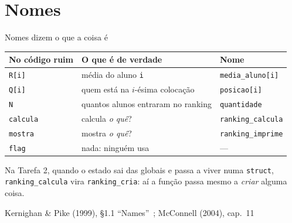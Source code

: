 \documentclass[aspectratio=169]{beamer}
\newcommand{\fonte}[1]{\vfill\hfill{\scriptsize\textcolor{UFSGray}{#1}}}
\begin{document}
\section{Nomes}

\begin{frame}{Nomes dizem o que a coisa é}
  \begin{center}
  \small
  \begin{tabular}{l l l}
    \toprule
    \textbf{No código ruim} & \textbf{O que é de verdade} &
      \textbf{Nome} \\
    \midrule
    \texttt{R[i]} & média do aluno \texttt{i} & \texttt{media\_aluno[i]} \\
    \texttt{Q[i]} & quem está na $i$-ésima colocação & \texttt{posicao[i]} \\
    \texttt{N} & quantos alunos entraram no ranking & \texttt{quantidade} \\
    \texttt{calcula} & calcula \emph{o quê}? & \texttt{ranking\_calcula} \\
    \texttt{mostra} & mostra \emph{o quê}? & \texttt{ranking\_imprime} \\
    \texttt{flag} & nada: ninguém usa & --- \\
    \bottomrule
  \end{tabular}
  \end{center}
  \begin{block}{}
    \small Na Tarefa 2, quando o estado sai das globais e passa a viver numa
    \texttt{struct}, \texttt{ranking\_calcula} vira \texttt{ranking\_cria}:
    aí a função passa mesmo a \emph{criar} alguma coisa.
  \end{block}
  \fonte{Kernighan \& Pike (1999), §1.1 ``Names''~\cite{kernighan1999practice}; McConnell (2004), cap.~11~\cite{mcconnell2004code}}
\end{frame}
\end{document}
